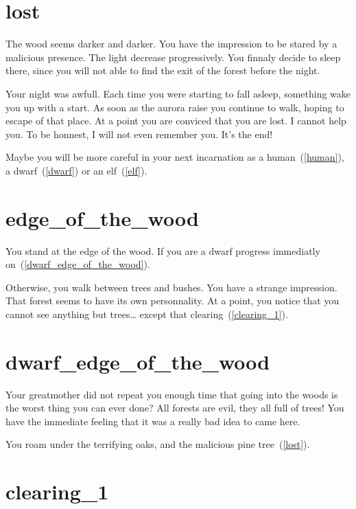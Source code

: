 \section{lost}

The wood seems darker and darker. You have the impression to be stared by a
malicious presence. The light decrease progressively. You finnaly decide to
sleep there, since you will not able to find the exit of the forest before the
night.

Your night was awfull. Each time you were starting to fall asleep, something
wake you up with a start. As soon as the aurora raise you continue to walk, hoping to
escape of that place. At a point you are conviced that you are lost. I cannot
help you. To be honnest, I will not even remember you. It's the end!

\medbreak

Maybe you will be more careful in your next incarnation as a
human~(\ref{human}), a dwarf~(\ref{dwarf}) or an elf~(\ref{elf}).

\section{edge_of_the_wood}

You stand at the edge of the wood. If you are a dwarf progress immediatly
on~(\ref{dwarf_edge_of_the_wood}).

\medbreak

Otherwise, you walk between trees and bushes. You have a strange impression.
That forest seems to have its own personnality. At a point, you notice that you
cannot see anything but trees… except that clearing~(\ref{clearing_1}).

\section{dwarf_edge_of_the_wood}

Your greatmother did not repeat you enough time that going into the woods is
the worst thing you can ever done? All forests are evil, they all full of trees!
You have the immediate feeling that it was a really bad idea to came here.

You roam under the terrifying oaks, and the malicious pine tree~(\ref{lost}).

\section{clearing_1}

